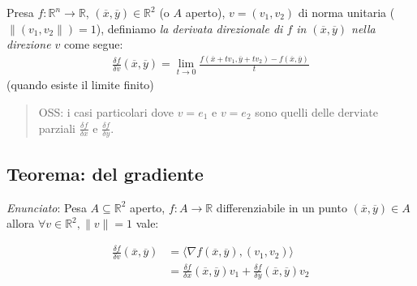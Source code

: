 \documentclass{article}
\begin{document}
Presa $f: \mathbb{R}^n \to \mathbb{R}$, $(\overline{x}, \overline{y}) \in \mathbb{R}^2$
(o $A$ aperto), $v = (v_1, v_2)$ di norma unitaria ($\|(v_1, v_2\|) = 1$), definiamo
\emph{la derivata direzionale di $f$ in $(\overline{x}, \overline{y})$ nella direzione
$v$} come segue:
\begin{align*}
  \frac{\delta f}{\delta v}(\overline{x}, \overline{y}) = \lim_{t \to 0}
    \frac{f(\overline{x} + tv_1, \overline{y} + tv_2) - f(\overline{x}, \overline{y})}{t}
\end{align*}
(quando esiste il limite finito)

\begin{quote}
  OSS: i casi particolari dove $v = e_1$ e $v = e_2$ sono quelli delle derviate
  parziali $\frac{\delta f}{\delta x}$ e $\frac{\delta f}{\delta y}$.
\end{quote}

\subsection{Teorema: del gradiente}

\emph{Enunciato}: Pesa $A \subseteq \mathbb{R}^2$ aperto, $f: A \to \mathbb{R}$
differenziabile in un punto $(\overline{x}, \overline{y}) \in A$ allora $\forall
v \in \mathbb{R}^2, \|v\| = 1$ vale:

\begin{align*}
  \frac{\delta f}{\delta v}(\overline{x}, \overline{y}) &= \langle \nabla
    f(\overline{x}, \overline{y}), (v_1, v_2) \rangle \\
  &= \frac{\delta f}{\delta x}(\overline{x}, \overline{y})v_1 +
    \frac{\delta f}{\delta y}(\overline{x}, \overline{y})v_2
\end{align*}
\end{document}
